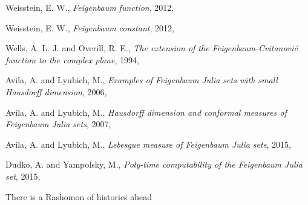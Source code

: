 \begin{description}
{Weisstein, E. W.},
{\em Feigenbaum function},
{2012},

{Weisstein, E. W.},
{\em Feigenbaum constant},
{2012},

{Wells, A. L. J. and Overill, R. E.},
{\em The extension of the {Feigenbaum-Cvitanovi{\'c}} function to the complex plane},
{1994},

{Avila, A. and Lyubich, M.},
  {\em Examples of {Feigenbaum Julia} sets with small {Hausdorff} dimension},
{2006},

{Avila, A. and Lyubich, M.},
  {\em Hausdorff dimension and conformal measures of {Feigenbaum Julia} sets},
{2007},

{Avila, A. and Lyubich, M.},
{\em Lebesgue measure of Feigenbaum Julia sets},
{2015},

{Dudko, A. and Yampolsky, M.},
  {\em Poly-time computability of the {Feigenbaum Julia} set},
{2015},




\end{description}


There is a Rashomon of histories ahead

